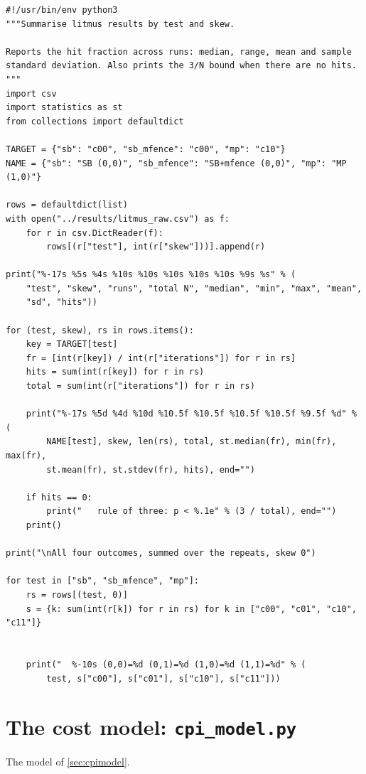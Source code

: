 \begin{lstlisting}[style=vspython]
#!/usr/bin/env python3
"""Summarise litmus results by test and skew.

Reports the hit fraction across runs: median, range, mean and sample
standard deviation. Also prints the 3/N bound when there are no hits.
"""
import csv
import statistics as st
from collections import defaultdict

TARGET = {"sb": "c00", "sb_mfence": "c00", "mp": "c10"}
NAME = {"sb": "SB (0,0)", "sb_mfence": "SB+mfence (0,0)", "mp": "MP (1,0)"}

rows = defaultdict(list)
with open("../results/litmus_raw.csv") as f:
    for r in csv.DictReader(f):
        rows[(r["test"], int(r["skew"]))].append(r)

print("%-17s %5s %4s %10s %10s %10s %10s %10s %9s %s" % (
    "test", "skew", "runs", "total N", "median", "min", "max", "mean",
    "sd", "hits"))

for (test, skew), rs in rows.items():
    key = TARGET[test]
    fr = [int(r[key]) / int(r["iterations"]) for r in rs]
    hits = sum(int(r[key]) for r in rs)
    total = sum(int(r["iterations"]) for r in rs)

    print("%-17s %5d %4d %10d %10.5f %10.5f %10.5f %10.5f %9.5f %d" % (
        NAME[test], skew, len(rs), total, st.median(fr), min(fr), max(fr),
        st.mean(fr), st.stdev(fr), hits), end="")
    
    if hits == 0:
        print("   rule of three: p < %.1e" % (3 / total), end="")
    print()

print("\nAll four outcomes, summed over the repeats, skew 0")

for test in ["sb", "sb_mfence", "mp"]:
    rs = rows[(test, 0)]
    s = {k: sum(int(r[k]) for r in rs) for k in ["c00", "c01", "c10", "c11"]}

    
    print("  %-10s (0,0)=%d (0,1)=%d (1,0)=%d (1,1)=%d" % (
        test, s["c00"], s["c01"], s["c10"], s["c11"]))
\end{lstlisting}

\section{The cost model: \texttt{cpi\_model.py}}
The model of \cref{sec:cpimodel}.

